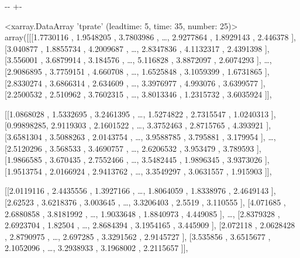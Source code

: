 \documentclass[letterpaper,10pt,english]{sphinxmanual}
\newlength\nbsphinxcodecellspacing
\begin{document}
{

\kern-\sphinxverbatimsmallskipamount\kern-\baselineskip
\kern+\FrameHeightAdjust\kern-\fboxrule
\vspace{\nbsphinxcodecellspacing}

\begin{sphinxVerbatim}[commandchars=\\\{\}]
\llap{\color{nbsphinxout}[11]:\,\hspace{\fboxrule}\hspace{\fboxsep}}<xarray.DataArray 'tprate' (leadtime: 5, time: 35, number: 25)>
array([[[1.7730116 , 1.9548205 , 3.7803986 , {\ldots}, 2.9277864 ,
         1.8929143 , 2.446378  ],
        [3.040877  , 1.8855734 , 4.2009687 , {\ldots}, 2.8347836 ,
         4.1132317 , 2.4391398 ],
        [3.556001  , 3.6879914 , 3.184576  , {\ldots}, 5.116828  ,
         3.8872097 , 2.6074293 ],
        {\ldots},
        [2.9086895 , 3.7759151 , 4.660708  , {\ldots}, 1.6525848 ,
         3.1059399 , 1.6731865 ],
        [2.8330274 , 3.6866314 , 2.634609  , {\ldots}, 3.3976977 ,
         4.993076  , 3.6399577 ],
        [2.2500532 , 2.510962  , 3.7602315 , {\ldots}, 3.8013346 ,
         1.2315732 , 3.6035924 ]],

       [[1.0868028 , 1.5332695 , 3.2461395 , {\ldots}, 1.5274822 ,
         2.7315547 , 1.0240313 ],
        [0.99898285, 2.9119303 , 2.1601522 , {\ldots}, 3.3752463 ,
         2.8715765 , 4.393921  ],
        [3.6581304 , 3.5088263 , 2.0143754 , {\ldots}, 3.9588785 ,
         3.795881  , 3.179954  ],
        {\ldots},
        [2.5120296 , 3.568533  , 3.4690757 , {\ldots}, 2.6206532 ,
         3.953479  , 3.789593  ],
        [1.9866585 , 3.670435  , 2.7552466 , {\ldots}, 3.5482445 ,
         1.9896345 , 3.9373026 ],
        [1.9513754 , 2.0166924 , 2.9413762 , {\ldots}, 3.3549297 ,
         3.0631557 , 1.915903  ]],

       [[2.0119116 , 2.4435556 , 1.3927166 , {\ldots}, 1.8064059 ,
         1.8338976 , 2.4649143 ],
        [2.62523   , 3.6218376 , 3.003645  , {\ldots}, 3.3206403 ,
         2.5519    , 3.110555  ],
        [4.071685  , 2.6880858 , 3.8181992 , {\ldots}, 1.9033648 ,
         1.8840973 , 4.449085  ],
        {\ldots},
        [2.8379328 , 2.6923704 , 1.82504   , {\ldots}, 2.8684394 ,
         3.1954165 , 3.445909  ],
        [2.072118  , 2.0628428 , 2.8790975 , {\ldots}, 2.697285  ,
         3.3291562 , 2.9145727 ],
        [3.535856  , 3.6515677 , 2.1052096 , {\ldots}, 3.2938933 ,
         3.1968002 , 2.2115657 ]],


\end{sphinxVerbatim}}
\end{document}
